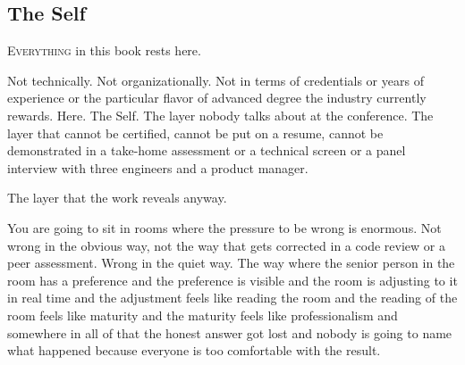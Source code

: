 {%
}

\vspace{1.5em}


\subsection*{The Self}

\lettrine[lines=3, loversize=0.1, lraise=0.9]{E}{verything} in this book rests here.

Not technically. Not organizationally. Not in terms of credentials or years of experience or the particular flavor of advanced degree the industry currently rewards. Here. The Self. The layer nobody talks about at the conference. The layer that cannot be certified, cannot be put on a resume, cannot be demonstrated in a take-home assessment or a technical screen or a panel interview with three engineers and a product manager.

The layer that the work reveals anyway.

You are going to sit in rooms where the pressure to be wrong is enormous. Not wrong in the obvious way, not the way that gets corrected in a code review or a peer assessment. Wrong in the quiet way. The way where the senior person in the room has a preference and the preference is visible and the room is adjusting to it in real time and the adjustment feels like reading the room and the reading of the room feels like maturity and the maturity feels like professionalism and somewhere in all of that the honest answer got lost and nobody is going to name what happened because everyone is too comfortable with the result.

